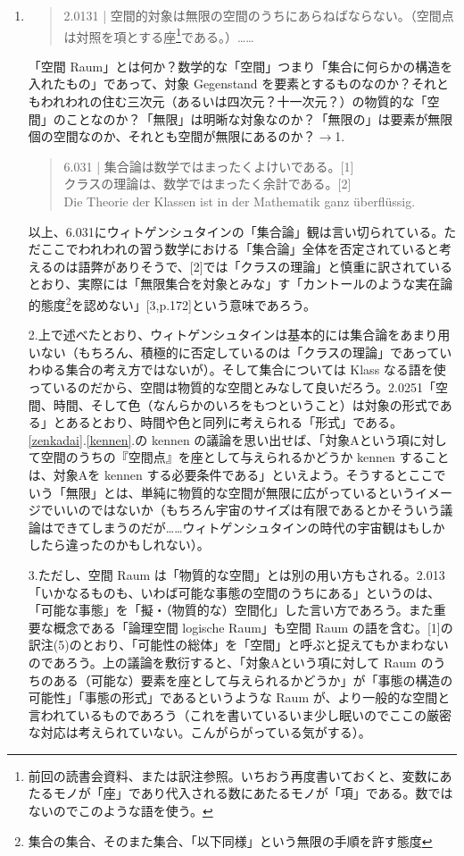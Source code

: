 \documentclass[11pt,a4paper]{jsarticle}
\begin{document}
\begin{enumerate}
\item
\begin{quote}
2.0131 | 空間的対象は無限の空間のうちにあらねばならない。（空間点は対照を項とする座\footnote{前回の読書会資料、または訳注参照。いちおう再度書いておくと、変数にあたるモノが「座」であり代入される数にあたるモノが「項」である。数ではないのでこのような語を使う。}である。）……
\end{quote}
「空間 Raum」とは何か？数学的な「空間」つまり「集合に何らかの構造を入れたもの」であって、対象 Gegenstand を要素とするものなのか？それともわれわれの住む三次元（あるいは四次元？十一次元？）の物質的な「空間」のことなのか？「無限」は明晰な対象なのか？「無限の」は要素が無限個の空間なのか、それとも空間が無限にあるのか？$\rightarrow$1.
\begin{quote}
6.031 | 集合論は数学ではまったくよけいである。[1] \\
 クラスの理論は、数学ではまったく余計である。[2] \\
 Die Theorie der Klassen ist in der Mathematik ganz \"uberfl\"ussig.
\end{quote}
以上、6.031にウィトゲンシュタインの「集合論」観は言い切られている。ただここでわれわれの習う数学における「集合論」全体を否定されていると考えるのは語弊がありそうで、[2]では「クラスの理論」と慎重に訳されているとおり、実際には「無限集合を対象とみな」す「カントールのような実在論的態度\footnote{集合の集合、そのまた集合、「以下同様」という無限の手順を許す態度}を認めない」[3,p.172]という意味であろう。

2.上で述べたとおり、ウィトゲンシュタインは基本的には集合論をあまり用いない（もちろん、積極的に否定しているのは「クラスの理論」であっていわゆる集合の考え方ではないが）。そして集合については Klass なる語を使っているのだから、空間は物質的な空間とみなして良いだろう。2.0251「空間、時間、そして色（なんらかのいろをもつということ）は対象の形式である」とあるとおり、時間や色と同列に考えられる「形式」である。\ref{zenkadai}.\ref{kennen}.の kennen の議論を思い出せば、「対象Aという項に対して空間のうちの『空間点』を座として与えられるかどうか kennen することは、対象Aを kennen する必要条件である」といえよう。そうするとここでいう「無限」とは、単純に物質的な空間が無限に広がっているというイメージでいいのではないか（もちろん宇宙のサイズは有限であるとかそういう議論はできてしまうのだが……ウィトゲンシュタインの時代の宇宙観はもしかしたら違ったのかもしれない）。

3.ただし、空間 Raum は「物質的な空間」とは別の用い方もされる。2.013「いかなるものも、いわば可能な事態の空間のうちにある」というのは、「可能な事態」を「擬・（物質的な）空間化」した言い方であろう。また重要な概念である「論理空間 logische Raum」も空間 Raum の語を含む。[1]の訳注(5)のとおり、「可能性の総体」を「空間」と呼ぶと捉えてもかまわないのであろう。上の議論を敷衍すると、「対象Aという項に対して Raum のうちのある（可能な）要素を座として与えられるかどうか」が「事態の構造の可能性」「事態の形式」であるというような Raum が、より一般的な空間と言われているものであろう（これを書いているいま少し眠いのでここの厳密な対応は考えられていない。こんがらがっている気がする）。
\end{enumerate}
\end{document}
